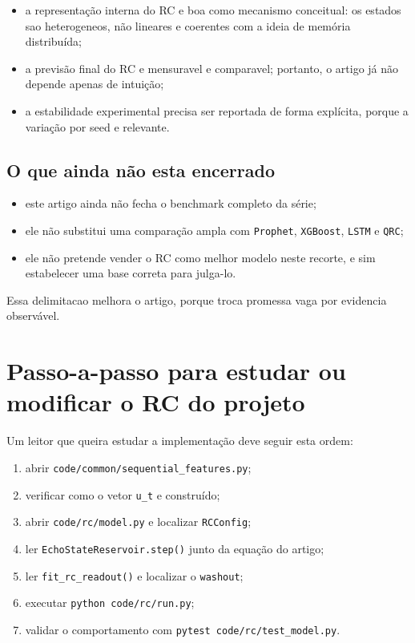 \documentclass[12pt]{article}
\providecommand{\tightlist}{%
              \setlength{\itemsep}{0pt}\setlength{\parskip}{0pt}}
\begin{document}
\begin{itemize}
\tightlist
\item
  a representação interna do RC e boa como mecanismo conceitual: os estados sao heterogeneos, não lineares e coerentes com a ideia de memória distribuída;
\item
  a previsão final do RC e mensuravel e comparavel; portanto, o artigo já não depende apenas de intuição;
\item
  a estabilidade experimental precisa ser reportada de forma explícita, porque a variação por seed e relevante.
\end{itemize}

\subsection{O que ainda não esta encerrado}\label{142-o-que-ainda-nuxe3o-esta-encerrado}

\begin{itemize}
\tightlist
\item
  este artigo ainda não fecha o benchmark completo da série;
\item
  ele não substitui uma comparação ampla com \texttt{Prophet}, \texttt{XGBoost}, \texttt{LSTM} e \texttt{QRC};
\item
  ele não pretende vender o RC como melhor modelo neste recorte, e sim estabelecer uma base correta para julga-lo.
\end{itemize}

Essa delimitacao melhora o artigo, porque troca promessa vaga por evidencia observável.

\section{Passo-a-passo para estudar ou modificar o RC do projeto}\label{15-passo-a-passo-para-estudar-ou-modificar-o-rc-do-projeto}

Um leitor que queira estudar a implementação deve seguir esta ordem:

\begin{enumerate}
\def\labelenumi{\arabic{enumi}.}
\tightlist
\item
  abrir \texttt{code/common/sequential\_features.py};
\item
  verificar como o vetor \texttt{u\_t} e construído;
\item
  abrir \texttt{code/rc/model.py} e localizar \texttt{RCConfig};
\item
  ler \texttt{EchoStateReservoir.step()} junto da equação do artigo;
\item
  ler \texttt{fit\_rc\_readout()} e localizar o \texttt{washout};
\item
  executar \texttt{python\ code/rc/run.py};
\item
  validar o comportamento com \texttt{pytest\ code/rc/test\_model.py}.
\end{enumerate}
\end{document}
